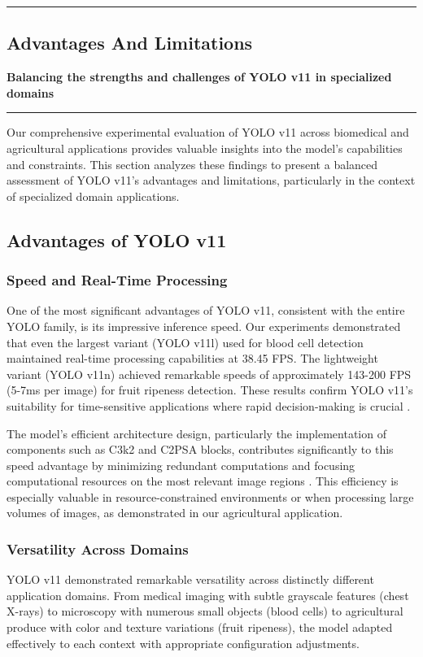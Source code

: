 {\color{gray}\hrule}
\begin{center}
\section{Advantages And Limitations}
\textbf{Balancing the strengths and challenges of YOLO v11 in specialized domains}
\bigskip
\end{center}
{\color{gray}\hrule}
\begin{multicols}{2}

Our comprehensive experimental evaluation of YOLO v11 across biomedical and agricultural applications provides valuable insights into the model's capabilities and constraints. This section analyzes these findings to present a balanced assessment of YOLO v11's advantages and limitations, particularly in the context of specialized domain applications.

\subsection{Advantages of YOLO v11}

\subsubsection{Speed and Real-Time Processing}
One of the most significant advantages of YOLO v11, consistent with the entire YOLO family, is its impressive inference speed. Our experiments demonstrated that even the largest variant (YOLO v11l) used for blood cell detection maintained real-time processing capabilities at 38.45 FPS. The lightweight variant (YOLO v11n) achieved remarkable speeds of approximately 143-200 FPS (5-7ms per image) for fruit ripeness detection. These results confirm YOLO v11's suitability for time-sensitive applications where rapid decision-making is crucial \citep{Ultralytics2024}.

The model's efficient architecture design, particularly the implementation of components such as C3k2 and C2PSA blocks, contributes significantly to this speed advantage by minimizing redundant computations and focusing computational resources on the most relevant image regions \citep{Rao2024}. This efficiency is especially valuable in resource-constrained environments or when processing large volumes of images, as demonstrated in our agricultural application.

\subsubsection{Versatility Across Domains}
YOLO v11 demonstrated remarkable versatility across distinctly different application domains. From medical imaging with subtle grayscale features (chest X-rays) to microscopy with numerous small objects (blood cells) to agricultural produce with color and texture variations (fruit ripeness), the model adapted effectively to each context with appropriate configuration adjustments.


\end{multicols}
